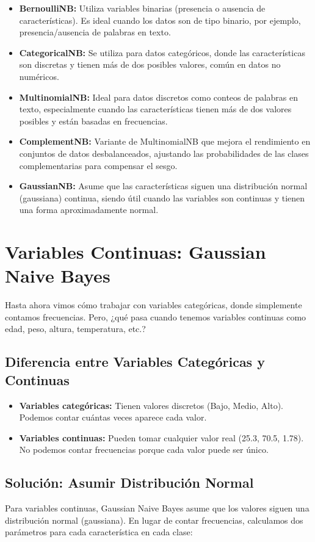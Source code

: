 \documentclass[12pt]{article}
\begin{document}
\begin{itemize}
    \item \textbf{BernoulliNB:} Utiliza variables binarias (presencia o ausencia de características). Es ideal cuando los datos son de tipo binario, por ejemplo, presencia/ausencia de palabras en texto.
    \item \textbf{CategoricalNB:} Se utiliza para datos categóricos, donde las características son discretas y tienen más de dos posibles valores, común en datos no numéricos.
    \item \textbf{MultinomialNB:} Ideal para datos discretos como conteos de palabras en texto, especialmente cuando las características tienen más de dos valores posibles y están basadas en frecuencias.
    \item \textbf{ComplementNB:} Variante de MultinomialNB que mejora el rendimiento en conjuntos de datos desbalanceados, ajustando las probabilidades de las clases complementarias para compensar el sesgo.
    \item \textbf{GaussianNB:} Asume que las características siguen una distribución normal (gaussiana) continua, siendo útil cuando las variables son continuas y tienen una forma aproximadamente normal.
\end{itemize}

\section{Variables Continuas: Gaussian Naive Bayes}
Hasta ahora vimos cómo trabajar con variables categóricas, donde simplemente contamos frecuencias. Pero, ¿qué pasa cuando tenemos variables continuas como edad, peso, altura, temperatura, etc.?

\subsection{Diferencia entre Variables Categóricas y Continuas}
\begin{itemize}
    \item \textbf{Variables categóricas:} Tienen valores discretos (Bajo, Medio, Alto). Podemos contar cuántas veces aparece cada valor.
    \item \textbf{Variables continuas:} Pueden tomar cualquier valor real (25.3, 70.5, 1.78). No podemos contar frecuencias porque cada valor puede ser único.
\end{itemize}

\subsection{Solución: Asumir Distribución Normal}
Para variables continuas, Gaussian Naive Bayes asume que los valores siguen una distribución normal (gaussiana). En lugar de contar frecuencias, calculamos dos parámetros para cada característica en cada clase:
\end{document}
